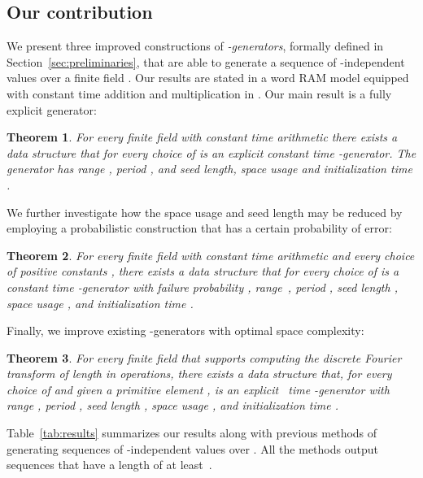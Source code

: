 \documentclass[a4paper,11pt]{article}
\theoremstyle{plain}
\newtheorem{theorem}{Theorem}
\theoremstyle{definition}
\begin{document}
\subsection{Our contribution}
We present three improved constructions of \emph{-generators}, formally defined in Section~\ref{sec:preliminaries}, that are able to generate a sequence of -independent values over a finite field .
Our results are stated in a word RAM model equipped with constant time addition and multiplication in .     
Our main result is a fully explicit generator:
\begin{theorem}\label{thm:explicit}
For every finite field  with constant time arithmetic there exists a data structure that for every choice of  is an explicit constant time -generator.
The generator has range , period , and seed length, space usage and initialization time .
\end{theorem}
We further investigate how the space usage and seed length may be reduced by employing a probabilistic construction that has a certain probability of error:
\begin{theorem} \label{thm:existence}
For every finite field  with constant time arithmetic and every choice of positive constants ,  there exists a data structure 
that for every choice of  is a constant time -generator with failure probability ,
range~, period , seed length , space usage , and initialization time .
\end{theorem}
Finally, we improve existing -generators with optimal space complexity:
\begin{theorem} \label{thm:fastmultipoint}
For every finite field  that supports computing the discrete Fourier transform of length  in  operations, 
there exists a data structure that, for every choice of  and given a primitive element , 
is an explicit ~time -generator with range , period , seed length , space usage , and initialization time .
\end{theorem}

Table~\ref{tab:results} summarizes our results along with previous methods of generating sequences of -independent values over . 
All the methods output sequences that have a length of at least~.
\end{document}
